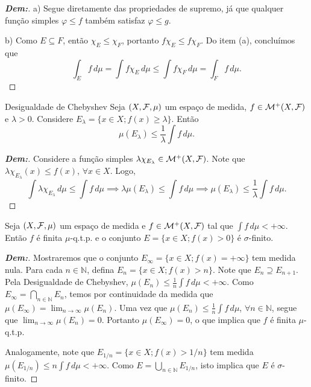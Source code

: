 \begin{proof}[\textbf{Dem:}]
a) Segue diretamente das propriedades de supremo, já que qualquer função simples $\varphi \le f$ também satisfaz $\varphi \le g$.

b) Como $E \subseteq F$, então $\chi_E \le \chi_F$, portanto $f\chi_E \le f\chi_F$. Do item (a), concluímos que
$$ \int_E f \, d\mu = \int f\chi_E \, d\mu \le \int f\chi_F \, d\mu = \int_F f \, d\mu. $$
\end{proof}

\begin{prop*}{Desigualdade de Chebyshev}
Seja $(X, \mathcal{F}, \mu)$ um espaço de medida, $f \in \mathcal{M}^+(X, \mathcal{F})$ e $\lambda > 0$. Considere $E_\lambda = \{x \in X ; f(x) \ge \lambda\}$. Então
$$ \mu(E_\lambda) \le \frac{1}{\lambda} \int f \, d\mu. $$
\end{prop*}

\begin{proof}[\textbf{Dem:}]
Considere a função simples $\lambda \chi_{E_\lambda} \in \mathcal{M}^+(X, \mathcal{F})$. Note que $\lambda \chi_{E_\lambda}(x) \le f(x)$, $\forall x \in X$. Logo,
$$ \int \lambda \chi_{E_\lambda} \, d\mu \le \int f \, d\mu \implies \lambda \mu(E_\lambda) \le \int f \, d\mu \implies \mu(E_\lambda) \le \frac{1}{\lambda} \int f \, d\mu. $$
\end{proof}

\begin{corollary*}{}
Seja $(X, \mathcal{F}, \mu)$ um espaço de medida e $f \in \mathcal{M}^+(X, \mathcal{F})$ tal que $\int f \, d\mu < +\infty$. Então $f$ é finita $\mu$-q.t.p. e o conjunto $E = \{x \in X ; f(x) > 0\}$ é $\sigma$-finito.
\end{corollary*}

\begin{proof}[\textbf{Dem:}]
Mostraremos que o conjunto $E_\infty = \{x \in X ; f(x) = +\infty\}$ tem medida nula. Para cada $n \in \mathbb{N}$, defina $E_n = \{x \in X ; f(x) > n\}$. Note que $E_n \supseteq E_{n+1}$. Pela Desigualdade de Chebyshev, $\mu(E_n) \le \frac{1}{n} \int f \, d\mu < +\infty$.
Como $E_\infty = \bigcap_{n \in \mathbb{N}} E_n$, temos por continuidade da medida que $\mu(E_\infty) = \lim_{n \to \infty} \mu(E_n)$.
Uma vez que $\mu(E_n) \le \frac{1}{n} \int f \, d\mu$, $\forall n \in \mathbb{N}$, segue que $\lim_{n \to \infty} \mu(E_n) = 0$. Portanto $\mu(E_\infty) = 0$, o que implica que $f$ é finita $\mu$-q.t.p.

Analogamente, note que $E_{1/n} = \{x \in X ; f(x) > 1/n\}$ tem medida $\mu(E_{1/n}) \le n \int f \, d\mu < +\infty$. Como $E = \bigcup_{n \in \mathbb{N}} E_{1/n}$, isto implica que $E$ é $\sigma$-finito.
\end{proof}

